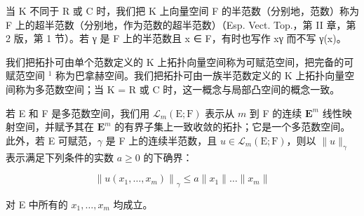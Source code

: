 
当 K 不同于 R 或 C 时，我们把 K 上向量空间 F 的半范数（分别地，范数）称为 F 上的超半范数（分别地，作为范数的超半范数）（Esp. Vect. Top.，第 II 章，第 2 版，第 1 节）。若 γ 是 F 上的半范数且 x ∈ F，有时也写作 \textbar\textbar x\textbar\textbar γ 而不写 γ(x)。

我们把拓扑可由单个范数定义的 K 上拓扑向量空间称为可赋范空间，把完备的可赋范空间 \(^{1}\) 称为巴拿赫空间。我们把拓扑可由一族半范数定义的 K 上拓扑向量空间称为多范数空间；当 K = R 或 C 时，这一概念与局部凸空间的概念一致。

若 E 和 F 是多范数空间，我们用 \(\mathcal{L}_{m}(\mathrm{E};\mathrm{F})\) 表示从 \(m\) 到 F 的连续 \(\mathbf{E}^{m}\) 线性映射空间，并赋予其在 \(\mathbf{E}^{m}\) 的有界子集上一致收敛的拓扑；它是一个多范数空间。此外，若 E 可赋范，\(\gamma\) 是 F 上的连续半范数，且 \(u\in\mathcal{L}_{m}(\mathrm{E};\mathrm{F})\)，则以 \(\|u\|_{\gamma}\) 表示满足下列条件的实数 \(a\geqslant0\) 的下确界：

\[
\left\| u (x _ {1}, \dots , x _ {m}) \right\| _ {\gamma} \leqslant a \| x _ {1} \| \dots \| x _ {m} \|
\]

对 E 中所有的 \(x_{1}, \ldots, x_{m}\) 均成立。

